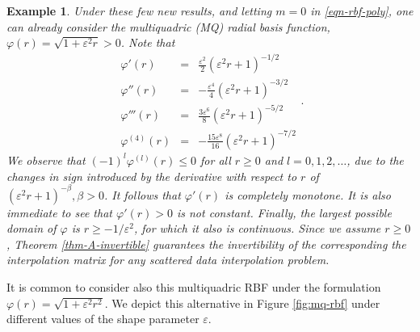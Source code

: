 \documentclass[12pt]{report} %
\newtheorem{example}{Example}
\begin{document}
\begin{example}
  Under these few new results, and letting $m = 0$ in \eqref{eqn-rbf-poly},
  one can already consider the multiquadric (MQ) radial basis function,
  $\varphi (r) = \sqrt{1 + \varepsilon^2 r} > 0$. Note that
  \[ \begin{array}{ccl}
      \varphi' (r)      & = & \frac{\varepsilon^2}{2} (\varepsilon^2 r + 1)^{- 1 /
      2}                                                                           \\
      \varphi'' (r)     & = & - \frac{\varepsilon^4}{4} (\varepsilon^2 r + 1)^{-
      3 / 2}                                                                       \\
      \varphi''' (r)    & = & \frac{3 \varepsilon^6}{8} (\varepsilon^2 r + 1)^{-
      5 / 2}                                                                       \\
      \varphi^{(4)} (r) & = & - \frac{15 \varepsilon^8}{16} (\varepsilon^2 r
      + 1)^{- 7 / 2}
    \end{array} . \]
  We observe that $(- 1)^l \varphi^{(l)} (r) \leq 0$ for all $r \geq 0$ and $l
    = 0, 1, 2, \ldots$, due to the changes in sign introduced by the derivative
  with respect to $r$ of $(\varepsilon^2 r + 1)^{- \beta}, \beta > 0$. It
  follows that $\varphi' (r)$ is completely monotone. It is also immediate to
  see that $\varphi' (r) > 0$ is not constant. Finally, the largest possible
  domain of $\varphi$ is $r \geq - 1 / \varepsilon^2$, for which it also is
  continuous. Since we assume $r \geq 0$, Theorem \ref{thm-A-invertible}
  guarantees the invertibility of the corresponding the interpolation matrix for
  any scattered data interpolation problem.
\end{example}

It is common to consider also this multiquadric RBF under the formulation
$\varphi (r) = \sqrt{1 + \varepsilon^2 r^2}$. We depict this alternative in
Figure \ref{fig:mq-rbf} under different values of the shape parameter
$\varepsilon$.
\end{document}
